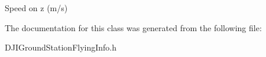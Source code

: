 Speed on z (m/s) 

The documentation for this class was generated from the following file\+:\begin{DoxyCompactItemize}
\item 
D\+J\+I\+Ground\+Station\+Flying\+Info.\+h\end{DoxyCompactItemize}
